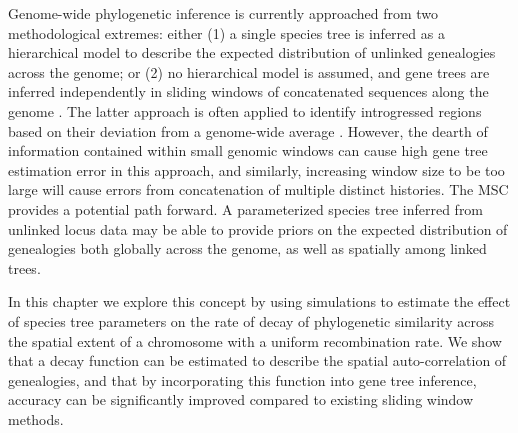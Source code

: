 \documentclass[11pt]{article}
\begin{document}
Genome-wide phylogenetic inference is currently approached from two methodological extremes: either (1) a single species tree is inferred as a hierarchical model to describe the expected distribution of unlinked genealogies across the genome; or (2) no hierarchical model is assumed, and gene trees are inferred independently in sliding windows of concatenated sequences along the genome \citep{martin_exploring_2017}. The latter approach is often applied to identify introgressed regions based on their deviation from a genome-wide average \citep{wang_evidence_2019}. However, the dearth of information contained within small genomic windows can cause high gene tree estimation error in this approach, and similarly, increasing window size to be too large will cause errors from concatenation of multiple distinct histories. The MSC provides a potential path forward. 
A parameterized species tree inferred from unlinked locus data may be able to provide priors on the expected distribution of genealogies both globally across the genome, as well as spatially among linked trees.

In this chapter we explore this concept by using simulations to estimate the effect of species tree parameters on the rate of decay of phylogenetic similarity across the spatial extent of a chromosome with a uniform recombination rate. We show that a decay function can be estimated to describe the spatial auto-correlation of genealogies, and that by incorporating this function into gene tree inference, accuracy can be significantly improved compared to existing sliding window methods. 



\end{document}
